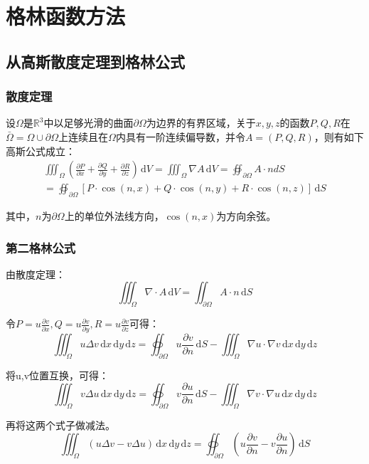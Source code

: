 
\chapter{格林函数方法}

\section{从高斯散度定理到格林公式}

\subsection{散度定理}

设\(\Omega\)是\(\mathbb{R}^3\)中以足够光滑的曲面\(\partial\Omega\)为边界的有界区域，关于\(x,y,z\)的函数\(P,Q,R\)在\(\bar{\Omega}=\Omega\cup\partial\Omega\)上连续且在\(\Omega\)内具有一阶连续偏导数，并令\(A=(P,Q,R)\)，则有如下高斯公式成立：
\begin{gather*}
\iiint_{\Omega}\left(\frac{\partial P}{\partial x}+\frac{\partial Q}{\partial y}+\frac{\partial R}{\partial z}\right)\,\mathrm{d}V=\iiint_{\Omega}\nabla A\,\mathrm{d}V=\oiint_{\partial\Omega}{A\cdot n d S}\\
=\oiint_{\partial\Omega}[P\cdot\cos{(n,x)}+Q\cdot\cos{(n,y)}+R\cdot\cos{(n,z)}]\,\mathrm{d}S
\end{gather*}

其中，\(n\)为\(\partial\Omega\)上的单位外法线方向，\(\cos{(n,x)}\)为方向余弦。

\subsection{第二格林公式}

由散度定理：
\[
\iiint_{\Omega}\nabla\cdot A\,\mathrm{d}V=\iint_{\partial\Omega} A\cdot n\,\mathrm{d}S
\]

令\(P=u\frac{\partial v}{\partial x},Q=u\frac{\partial v}{\partial y},R=u\frac{\partial v}{\partial z}\)可得：
\[
\iiint_{\Omega} u\Delta v\,\mathrm{d}x\,\mathrm{d}y\,\mathrm{d}z=\oiint_{\partial\Omega}{u\frac{\partial v}{\partial n}\,\mathrm{d}S}-\iiint_{\Omega}\nabla u\cdot\nabla v\,\mathrm{d}x\,\mathrm{d}y\,\mathrm{d}z
\]

将u,v位置互换，可得：
\[
\iiint_{\Omega} v\Delta u\,\mathrm{d}x\,\mathrm{d}y\,\mathrm{d}z=\oiint_{\partial\Omega}{v\frac{\partial u}{\partial n}\,\mathrm{d}S}-\iiint_{\Omega}\nabla v\cdot\nabla u\,\mathrm{d}x\,\mathrm{d}y\,\mathrm{d}z
\]

再将这两个式子做减法。
\[
\iiint_\Omega(u\Delta v-v\Delta u)\,\mathrm{d}x\,\mathrm{d}y\,\mathrm{d}z=\oiint_{\partial\Omega}\left(u\frac{\partial v}{\partial n}-v\frac{\partial u}{\partial n}\right)\,\mathrm{d}S
\]

